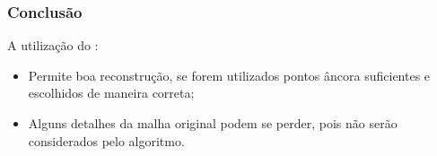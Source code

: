 \begin{frame}
\frametitle{Conclusão}

A utilização do :

\bigskip

\begin{itemize}
\item Permite boa reconstrução, se forem utilizados pontos âncora suficientes e escolhidos de maneira correta;
\item Alguns detalhes da malha original podem se perder, pois não serão considerados pelo algoritmo.
\end{itemize}

\end{frame}


